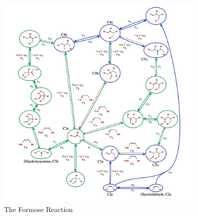 \documentclass[]{article}
\begin{document}
\begin{figure}[H]
	\caption[The Formose Reaction]{The Formose Reaction\cite{andersen2013generic}}\label{fig:Formose}
	\includegraphics[width=0.9\textwidth]{Formose}
\end{figure}
\end{document}

